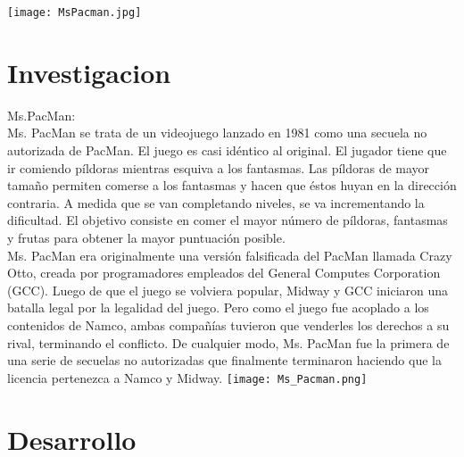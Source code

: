 \documentclass[11pt]{article}
\begin{document}
\texttt{[image: MsPacman.jpg]} 

\newpage
\section{Investigacion}
Ms.PacMan:\\
Ms. PacMan se trata de un videojuego lanzado en 1981 como una secuela no autorizada de PacMan. El juego es casi idéntico al original. El jugador tiene que ir comiendo píldoras mientras esquiva a los fantasmas. Las píldoras de mayor tamaño permiten comerse a los fantasmas y hacen que éstos huyan en la dirección contraria. A medida que se van completando niveles, se va incrementando la dificultad. El objetivo consiste en comer el mayor número de píldoras, fantasmas y frutas para obtener la mayor puntuación posible.\\
\linebreak
Ms. PacMan era originalmente una versión falsificada del PacMan llamada Crazy Otto, creada por programadores empleados del General Computes Corporation (GCC). Luego de que el juego se volviera popular, Midway y GCC iniciaron una batalla legal por la legalidad del juego. Pero como el juego fue acoplado a los contenidos de Namco, ambas compañías tuvieron que venderles los derechos a su rival, terminando el conflicto. De cualquier modo, Ms. PacMan fue la primera de una serie de secuelas no autorizadas que finalmente terminaron haciendo que la licencia pertenezca a Namco y Midway.
\linebreak
\texttt{[image: Ms\_Pacman.png]} 
 
\newpage
\section{Desarrollo}
\end{document}
